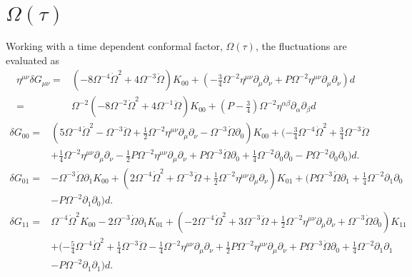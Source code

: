 \documentclass[10pt,letterpaper]{article}
\begin{document}
\section*{$\Omega(\tau)$}
Working with a time dependent conformal factor, $\Omega(\tau)$, the fluctuations are evaluated as 
\begin{align}
\eta^{\mu\nu}\delta G_{\mu\nu}={}&(-8 \Omega^{-4} \dot{\Omega}^2 + 4 \Omega^{-3} \ddot{\Omega}) K_{00} + (- \tfrac{3}{4} \Omega^{-2} \eta^{\mu \nu} \partial_{\mu} \partial_{\nu} + P \Omega^{-2} \eta^{\mu \nu} \partial_{\mu} \partial_{\nu}) d
 \nonumber \\
={}&\Omega^{-2}(-8 \Omega^{-2} \dot{\Omega}^2
 + 4 \Omega^{-1} \ddot{\Omega}) K_{00} +(P-\tfrac34) \Omega^{-2}\eta^{\alpha\beta}\partial_\alpha\partial_\beta d
\end{align}
\begin{align}
\delta G_{00}={}&(5 \Omega^{-4} \dot{\Omega}^2
 -  \Omega^{-3} \ddot{\Omega}
 + \tfrac{1}{2} \Omega^{-2} \eta^{\mu \nu} \partial_{\mu} \partial_{\nu}
 -  \Omega^{-3} \dot{\Omega} \partial_{0}) K_{00}
 + (- \tfrac{3}{4} \Omega^{-4} \dot{\Omega}^2
 + \tfrac{3}{4} \Omega^{-3} \ddot{\Omega}\nonumber\\
& + \tfrac{1}{4} \Omega^{-2} \eta^{\mu \nu} \partial_{\mu} \partial_{\nu}
 -  \tfrac{1}{2} P \Omega^{-2} \eta^{\mu \nu} \partial_{\mu} \partial_{\nu}
 + P \Omega^{-3} \dot{\Omega} \partial_{0}
 + \tfrac{1}{4} \Omega^{-2} \partial_{0} \partial_{0}
 -  P \Omega^{-2} \partial_{0} \partial_{0}) d.
\end{align}
\begin{align}
\delta G_{01}={}&- \Omega^{-3} \dot{\Omega} \partial_{1} K_{00}
 + (2 \Omega^{-4} \dot{\Omega}^2
 + \Omega^{-3} \ddot{\Omega}
 + \tfrac{1}{2} \Omega^{-2} \eta^{\mu \nu} \partial_{\mu} \partial_{\nu}) K_{01}
 + (P \Omega^{-3} \dot{\Omega} \partial_{1}
 + \tfrac{1}{4} \Omega^{-2} \partial_{1} \partial_{0}\nonumber\\
& -  P \Omega^{-2} \partial_{1} \partial_{0}) d.
\end{align}
\begin{align}
\delta G_{11}={}&\Omega^{-4} \dot{\Omega}^2 K_{00}
 - 2 \Omega^{-3} \dot{\Omega} \partial_{1} K_{01}
 + (-2 \Omega^{-4} \dot{\Omega}^2
 + 3 \Omega^{-3} \ddot{\Omega}
 + \tfrac{1}{2} \Omega^{-2} \eta^{\mu \nu} \partial_{\mu} \partial_{\nu}
 + \Omega^{-3} \dot{\Omega} \partial_{0}) K_{11}\nonumber\\
& + (- \tfrac{5}{4} \Omega^{-4} \dot{\Omega}^2
 + \tfrac{1}{4} \Omega^{-3} \ddot{\Omega}
 -  \tfrac{1}{4} \Omega^{-2} \eta^{\mu \nu} \partial_{\mu} \partial_{\nu}
 + \tfrac{1}{2} P \Omega^{-2} \eta^{\mu \nu} \partial_{\mu} \partial_{\nu}
 + P \Omega^{-3} \dot{\Omega} \partial_{0}
 + \tfrac{1}{4} \Omega^{-2} \partial_{1} \partial_{1}\nonumber\\
& -  P \Omega^{-2} \partial_{1} \partial_{1}) d.
\end{align}
\end{document}
